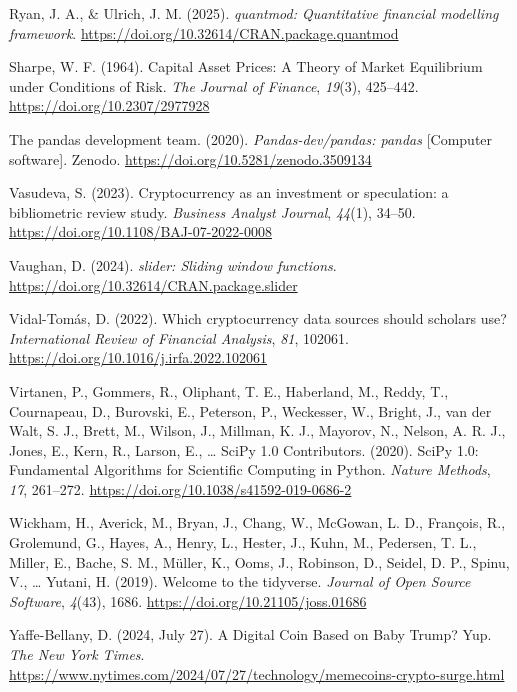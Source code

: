 \documentclass[
  12pt,
  a4paper,
  openany]{scrbook}
\newlength{\cslhangindent}
\newenvironment{CSLReferences}[2] %
 {\begin{list}{}{%
  \setlength{\itemindent}{0pt}
  \setlength{\leftmargin}{0pt}
  \setlength{\parsep}{0pt}
  \ifodd #1
   \setlength{\leftmargin}{\cslhangindent}
   \setlength{\itemindent}{-1\cslhangindent}
  \fi
  \setlength{\itemsep}{#2\baselineskip}}}
 {\end{list}}
\begin{document}
\begin{CSLReferences}{1}{0}
Ryan, J. A., \& Ulrich, J. M. (2025). \emph{{quantmod}: Quantitative
financial modelling framework}.
\url{https://doi.org/10.32614/CRAN.package.quantmod}

Sharpe, W. F. (1964). Capital Asset Prices: A Theory of Market
Equilibrium under Conditions of Risk. \emph{The Journal of Finance},
\emph{19}(3), 425--442. \url{https://doi.org/10.2307/2977928}

The pandas development team. (2020). \emph{Pandas-dev/pandas: pandas}
{[}Computer software{]}. Zenodo.
\url{https://doi.org/10.5281/zenodo.3509134}

Vasudeva, S. (2023). Cryptocurrency as an investment or speculation: a
bibliometric review study. \emph{Business Analyst Journal},
\emph{44}(1), 34--50. \url{https://doi.org/10.1108/BAJ-07-2022-0008}

Vaughan, D. (2024). \emph{{slider}: Sliding window functions}.
\url{https://doi.org/10.32614/CRAN.package.slider}

Vidal-Tomás, D. (2022). Which cryptocurrency data sources should
scholars use? \emph{International Review of Financial Analysis},
\emph{81}, 102061. \url{https://doi.org/10.1016/j.irfa.2022.102061}

Virtanen, P., Gommers, R., Oliphant, T. E., Haberland, M., Reddy, T.,
Cournapeau, D., Burovski, E., Peterson, P., Weckesser, W., Bright, J.,
van der Walt, S. J., Brett, M., Wilson, J., Millman, K. J., Mayorov, N.,
Nelson, A. R. J., Jones, E., Kern, R., Larson, E., \ldots{} SciPy 1.0
Contributors. (2020). {{SciPy} 1.0: Fundamental Algorithms for
Scientific Computing in Python}. \emph{Nature Methods}, \emph{17},
261--272. \url{https://doi.org/10.1038/s41592-019-0686-2}

Wickham, H., Averick, M., Bryan, J., Chang, W., McGowan, L. D.,
François, R., Grolemund, G., Hayes, A., Henry, L., Hester, J., Kuhn, M.,
Pedersen, T. L., Miller, E., Bache, S. M., Müller, K., Ooms, J.,
Robinson, D., Seidel, D. P., Spinu, V., \ldots{} Yutani, H. (2019).
Welcome to the {tidyverse}. \emph{Journal of Open Source Software},
\emph{4}(43), 1686. \url{https://doi.org/10.21105/joss.01686}

Yaffe-Bellany, D. (2024, July 27). A Digital Coin Based on Baby Trump?
Yup. \emph{The New York Times}.
\url{https://www.nytimes.com/2024/07/27/technology/memecoins-crypto-surge.html}


\end{CSLReferences}
\end{document}
